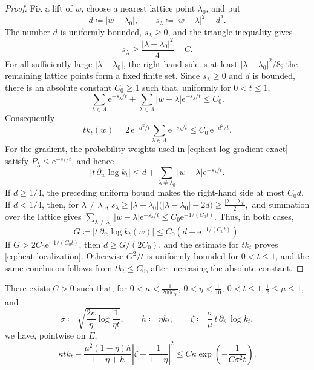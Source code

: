\documentclass[11pt,a4paper]{article}
\begin{document}
	\begin{proof}
		Fix a lift of $w$, choose a nearest lattice point $\lambda_0$, and put
		\[
			d\coloneqq|w-\lambda_0|,
			\qquad
			s_\lambda\coloneqq|w-\lambda|^2-d^2.
		\]
		The number $d$ is uniformly bounded, $s_\lambda\ge0$, and the triangle
		inequality gives
		\[
			s_\lambda\ge\frac{|\lambda-\lambda_0|^2}{4}-C.
		\]
		For all sufficiently large $|\lambda-\lambda_0|$, the right-hand side
		is at least $|\lambda-\lambda_0|^2/8$; the remaining lattice points
		form a fixed finite set.  Since $s_\lambda\ge0$ and $d$ is bounded,
		there is an absolute constant $C_0\ge1$ such that, uniformly for
		$0<t\le1$,
		\[
			\sum_{\lambda\in\Lambda}\mathrm{e}^{-s_\lambda/t}
			+\sum_{\lambda\in\Lambda}|w-\lambda|
			\mathrm{e}^{-s_\lambda/t}\le C_0.
		\]
		Consequently
		\[
			tk_t(w)=2\,\mathrm{e}^{-d^2/t}
			\sum_{\lambda\in\Lambda}\mathrm{e}^{-s_\lambda/t}
			\le C_0\,\mathrm{e}^{-d^2/t}.
		\]
		For the gradient, the probability weights used in
		\eqref{eq:heat-log-gradient-exact} satisfy
		$P_\lambda\le\mathrm{e}^{-s_\lambda/t}$, and hence
		\[
			\bigl|t\,\partial_{\bar w}\log k_t\bigr|
			\le d+\sum_{\lambda\ne\lambda_0}|w-\lambda|
			\mathrm{e}^{-s_\lambda/t}.
		\]
		If $d\ge1/4$, the preceding uniform bound makes the right-hand side
		at most $C_0d$.  If $d<1/4$, then, for $\lambda\ne\lambda_0$,
		\(
			s_\lambda\ge|\lambda-\lambda_0|
			\bigl(|\lambda-\lambda_0|-2d\bigr)
			\ge\frac{|\lambda-\lambda_0|}{2},
		\)
		and summation over the lattice gives
		$\sum_{\lambda\ne\lambda_0}|w-\lambda|
		\mathrm{e}^{-s_\lambda/t}\le
		C_0\mathrm{e}^{-1/(C_0t)}$.  Thus, in both cases,
		\[
			G\coloneqq\bigl|t\,\partial_{\bar w}\log k_t(w)\bigr|
			\le C_0\left(d+\mathrm{e}^{-1/(C_0t)}\right).
		\]
		If $G>2C_0\mathrm{e}^{-1/(C_0t)}$, then $d\ge G/(2C_0)$,
		and the estimate for $tk_t$ proves \eqref{eq:heat-localization}.
		Otherwise $G^2/t$ is uniformly bounded for $0<t\le1$, and the same
		conclusion follows from $tk_t\le C_0$, after increasing the absolute
		constant.
	\end{proof}

	\begin{lemma}
		\label{lem:heat-transition} There exists $C>0$ such that,
		for $0<\kappa<\frac{1}{200C_0}$,
		\(
			0<\eta<\frac{1}{10},\ 
			0<t\le1, \frac{1}{2}\le\mu\le1,
		\)
and
		\[
			\sigma\coloneqq
			\sqrt{\frac{2\kappa}{\eta}\log\frac1{\eta t}},\qquad
			h\coloneqq\eta k_t,\qquad
			\zeta\coloneqq\frac{\sigma}{\mu}\,
			t\,\partial_{\bar w}\log k_t,
		\]
		we have, pointwise on $E$,
		\begin{equation}\label{eq:heat-transition}
			\kappa tk_t-
			\frac{\mu^2(1-\eta)h}{1-\eta+h}
			\left|\zeta-\frac1{1-\eta}\right|^2
			\le C\kappa\exp\left(-\frac{1}{C\sigma^2t}\right).
		\end{equation}
	\end{lemma}
\end{document}
